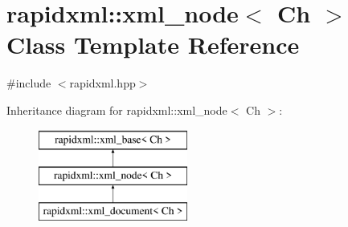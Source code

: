 \hypertarget{classrapidxml_1_1xml__node}{}\section{rapidxml\+:\+:xml\+\_\+node$<$ Ch $>$ Class Template Reference}
\label{classrapidxml_1_1xml__node}


{\ttfamily \#include $<$rapidxml.\+hpp$>$}

Inheritance diagram for rapidxml\+:\+:xml\+\_\+node$<$ Ch $>$\+:\begin{figure}[H]
\begin{center}
\leavevmode
\includegraphics[height=3.000000cm]{de/d82/classrapidxml_1_1xml__node}
\end{center}
\end{figure}
